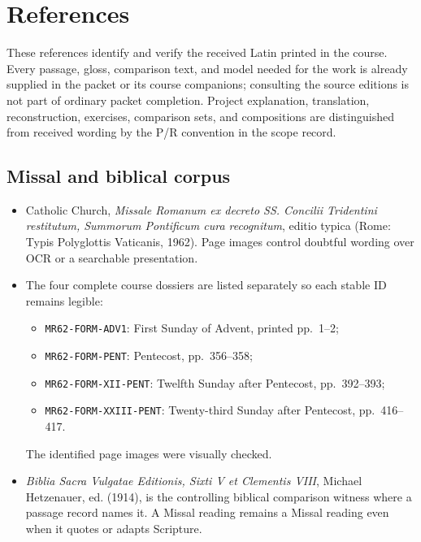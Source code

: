 \chapter{References}

These references identify and verify the received Latin printed in the
course. Every passage, gloss, comparison text, and model needed for the work is
already supplied in the packet or its course companions; consulting the source
editions is not part of ordinary packet completion. Project explanation,
translation, reconstruction, exercises, comparison sets, and compositions are
distinguished from received wording by the P/R convention in the scope record.

\section{Missal and biblical corpus}

\begin{itemize}
  \item Catholic Church, \textit{Missale Romanum ex decreto SS. Concilii
        Tridentini restitutum, Summorum Pontificum cura recognitum}, editio
        typica (Rome: Typis Polyglottis Vaticanis, 1962). Page images control
        doubtful wording over OCR or a searchable presentation.
  \item The four complete course dossiers are listed separately so each stable
        ID remains legible:
        \begin{itemize}
          \item \texttt{MR62-FORM-ADV1}: First Sunday of Advent, printed
                pp.~1--2;
          \item \texttt{MR62-FORM-PENT}: Pentecost, pp.~356--358;
          \item \texttt{MR62-FORM-XII-PENT}: Twelfth Sunday after Pentecost,
                pp.~392--393;
          \item \texttt{MR62-FORM-XXIII-PENT}: Twenty-third Sunday after
                Pentecost, pp.~416--417.
        \end{itemize}
        The identified page images were visually checked.
  \item \textit{Biblia Sacra Vulgatae Editionis, Sixti V et Clementis VIII},
        Michael Hetzenauer, ed. (1914), is the controlling biblical comparison
        witness where a passage record names it. A Missal reading remains a
        Missal reading even when it quotes or adapts Scripture.
\end{itemize}

